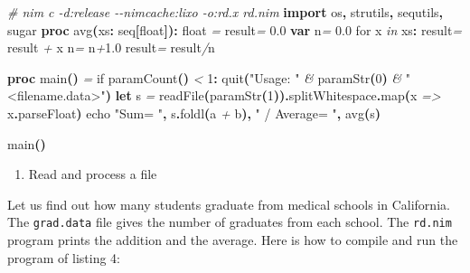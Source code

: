 \documentclass[
  12pt,
]{book}
\newenvironment{Shaded}{}{}
\newcommand{\CommentTok}[1]{\textcolor[rgb]{0.38,0.63,0.69}{\textit{#1}}}
\newcommand{\DataTypeTok}[1]{\textcolor[rgb]{0.56,0.13,0.00}{#1}}
\newcommand{\DecValTok}[1]{\textcolor[rgb]{0.25,0.63,0.44}{#1}}
\newcommand{\FloatTok}[1]{\textcolor[rgb]{0.25,0.63,0.44}{#1}}
\newcommand{\KeywordTok}[1]{\textcolor[rgb]{0.00,0.44,0.13}{\textbf{#1}}}
\newcommand{\NormalTok}[1]{#1}
\newcommand{\OtherTok}[1]{\textcolor[rgb]{0.00,0.44,0.13}{#1}}
\newcommand{\StringTok}[1]{\textcolor[rgb]{0.25,0.44,0.63}{#1}}
\providecommand{\tightlist}{%
  \setlength{\itemsep}{0pt}\setlength{\parskip}{0pt}}
\begin{document}
\begin{Shaded}
\begin{Highlighting}[]
\CommentTok{\# nim c {-}d:release {-}{-}nimcache:lixo {-}o:rd.x rd.nim}
\KeywordTok{import}\NormalTok{ os}\KeywordTok{,}\NormalTok{ strutils}\KeywordTok{,}\NormalTok{ sequtils}\KeywordTok{,}\NormalTok{ sugar}
\KeywordTok{proc }\StringTok{avg}\KeywordTok{(}\NormalTok{xs}\KeywordTok{:} \DataTypeTok{seq}\KeywordTok{[}\DataTypeTok{float}\KeywordTok{]):} \DataTypeTok{float} \CommentTok{=}
  \OtherTok{result}\CommentTok{=} \DecValTok{0}\FloatTok{.}\DecValTok{0}
  \KeywordTok{var}\NormalTok{ n}\CommentTok{=} \DecValTok{0}\FloatTok{.}\DecValTok{0}
  \DataTypeTok{for}\NormalTok{ x }\CommentTok{in}\NormalTok{ xs}\KeywordTok{:}
    \OtherTok{result}\CommentTok{=} \OtherTok{result} \CommentTok{+}\NormalTok{ x}
\NormalTok{    n}\CommentTok{=}\NormalTok{ n}\CommentTok{+}\DecValTok{1}\FloatTok{.}\DecValTok{0}
  \OtherTok{result}\CommentTok{=} \OtherTok{result}\CommentTok{/}\NormalTok{n}

\KeywordTok{proc }\StringTok{main}\KeywordTok{()} \CommentTok{=}
  \DataTypeTok{if} \DataTypeTok{paramCount}\KeywordTok{()} \CommentTok{\textless{}} \DecValTok{1}\KeywordTok{:} \DataTypeTok{quit}\KeywordTok{(}\StringTok{"Usage: "} \CommentTok{\&} \DataTypeTok{paramStr}\KeywordTok{(}\DecValTok{0}\KeywordTok{)} \CommentTok{\&} \StringTok{" \textless{}filename.data\textgreater{}"}\KeywordTok{)}
  \KeywordTok{let}\NormalTok{ s }\CommentTok{=} \DataTypeTok{readFile}\KeywordTok{(}\DataTypeTok{paramStr}\KeywordTok{(}\DecValTok{1}\KeywordTok{)).}\DataTypeTok{splitWhitespace}\KeywordTok{.}\DataTypeTok{map}\KeywordTok{(}\NormalTok{x }\CommentTok{=\textgreater{}}\NormalTok{ x}\KeywordTok{.}\DataTypeTok{parseFloat}\KeywordTok{)}
  \DataTypeTok{echo} \StringTok{"Sum= "}\KeywordTok{,}\NormalTok{ s}\KeywordTok{.}\DataTypeTok{foldl}\KeywordTok{(}\NormalTok{a }\CommentTok{+}\NormalTok{ b}\KeywordTok{),} \StringTok{" / Average= "}\KeywordTok{,} \DataTypeTok{avg}\KeywordTok{(}\NormalTok{s}\KeywordTok{)}

\DataTypeTok{main}\KeywordTok{()}
\end{Highlighting}
\end{Shaded}

\begin{enumerate}
\def\labelenumi{(\arabic{enumi})}
\setcounter{enumi}{3}
\tightlist
\item
  Read and process a file
\end{enumerate}

Let us find out how many students graduate from medical schools in
California. The \texttt{grad.data} file gives the number of graduates
from each school. The \texttt{rd.nim} program prints the addition and
the average. Here is how to compile and run the program of listing 4:
\end{document}
